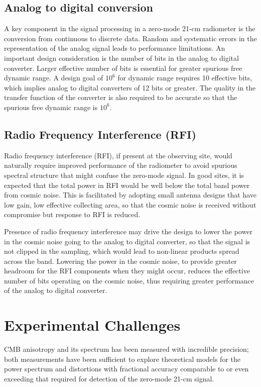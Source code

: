 \subsection{Analog to digital conversion}
 
 A key component in the signal processing in a zero-mode 21-cm radiometer is the conversion from continuous to discrete data.  Random and systematic errors in the representation of the analog signal leads to performance limitations.  An important design consideration is the number of bits in the analog to digital converter.  Larger effective number of bits is essential for greater spurious free dynamic range.  A design goal of $10^6$ for dynamic range requires 10 effective bits, which implies analog to digital converters of 12 bits or greater.  The quality in the transfer function of the converter is also required to be accurate so that the spurious free dynamic range is $10^6$.
 
\subsection{Radio Frequency Interference (RFI)}
  
  Radio frequency interference (RFI), if present at the observing site, would naturally require improved performance of the radiometer to avoid spurious spectral structure that might confuse the zero-mode signal.  In good sites, it is expected that the total power in RFI would be well below the total band power from cosmic noise.  This is facilitated by adopting small antenna designs that have low gain, low effective collecting area, so that the cosmic noise is received without compromise but response to RFI is reduced. 
 
 Presence of radio frequency interference may drive the design to lower the power in the cosmic noise going to the analog to digital converter, so that the signal is not clipped in the sampling, which would lead to non-linear products spread across the band.  Lowering the power in the cosmic noise, to provide greater headroom for the RFI components when they might occur, reduces the effective number of bits operating on the cosmic noise, thus requiring greater performance of the analog to digital converter.
   

\section{Experimental Challenges}

CMB anisotropy and its spectrum has been measured with incredible precision; both measurements have been sufficient to explore theoretical models for the power spectrum and distortions with fractional accuracy comparable to or even exceeding that required for detection of the zero-mode 21-cm signal. 


